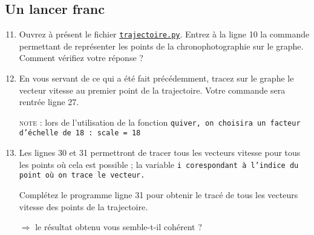 \documentclass[12pt]{article}
\begin{document}
\subsection{Un lancer franc}
\begin{enumerate}
 \setcounter{enumi}{10}
 \item \app \com \va Ouvrez à présent le fichier \href{https://github.com/formationPythonPC/formation20-21/tree/master/activites-2nde/3-tp-sports/trajectoire.py}{\underline{\texttt{trajectoire.py}}}. Entrez à la ligne 10 la commande permettant de représenter les points de la chronophotographie sur le graphe. Comment vérifiez votre réponse ? 
 
 \item \ar \com En vous servant de ce qui a été fait précédemment, tracez sur le graphe le vecteur vitesse au premier point de la trajectoire. Votre commande sera rentrée ligne 27.

 \textsc{note :} lors de l'utilisation de la fonction \tt{quiver}, on choisira un facteur d'échelle de 18 : \tt{scale = 18}
 
 \cpdepce
 
 
 
  \begin{center}
 \end{center}

 
 
 
\item \ar \com \va Les lignes 30 et 31 permettront de tracer tous les vecteurs vitesse pour tous les points où cela est possible ; la variable \tt{i} corespondant à l'indice du point où on trace le vecteur.

Complétez le programme ligne 31 pour obtenir le tracé de tous les vecteurs vitesse des points de la trajectoire.


  \begin{center}
 \end{center}


$\Longrightarrow$ le résultat obtenu vous semble-t-il cohérent ?
 
 \end{enumerate}


\grilleDS
\end{document}
